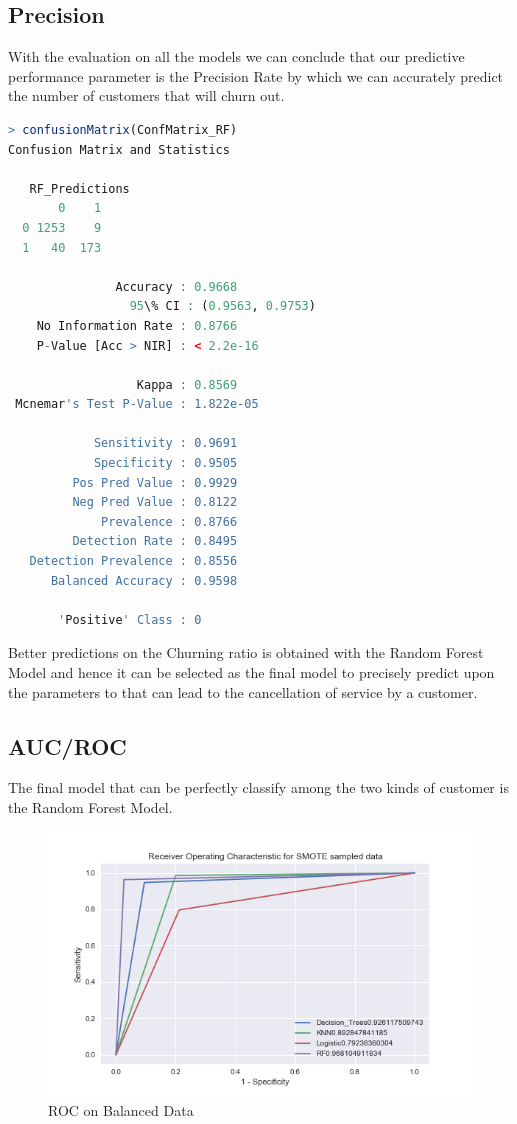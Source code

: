 \documentclass[a4paper,12pt]{report}
\begin{document}
\subsection{Precision}
With the evaluation on all the models we can conclude that our predictive performance parameter is the Precision Rate by which we can accurately predict the number of customers that will churn out.


\begin{lstlisting}[language=R, caption=RF performance]
> confusionMatrix(ConfMatrix_RF)
Confusion Matrix and Statistics

   RF_Predictions
       0    1
  0 1253    9
  1   40  173
                                          
               Accuracy : 0.9668          
                 95\% CI : (0.9563, 0.9753)
    No Information Rate : 0.8766          
    P-Value [Acc > NIR] : < 2.2e-16       
                                          
                  Kappa : 0.8569          
 Mcnemar's Test P-Value : 1.822e-05       
                                          
            Sensitivity : 0.9691          
            Specificity : 0.9505          
         Pos Pred Value : 0.9929          
         Neg Pred Value : 0.8122          
             Prevalence : 0.8766          
         Detection Rate : 0.8495          
   Detection Prevalence : 0.8556          
      Balanced Accuracy : 0.9598          
                                          
       'Positive' Class : 0           
\end{lstlisting}
Better predictions on the Churning ratio is obtained with the Random Forest Model and hence it can be selected as the final model to precisely predict upon the parameters to that can lead to the cancellation of service by a customer. 
\subsection{AUC/ROC}
The final model that can be perfectly classify among the two kinds of customer is the Random Forest Model.
\begin{figure}[!htbp]
\vspace{5pt}
\centering
\includegraphics[scale = 0.5]{Balanced_ROC.PNG}
\caption{ROC on Balanced Data}
\label{fig:4.1}
\end{figure}
\FloatBarrier
\end{document}
